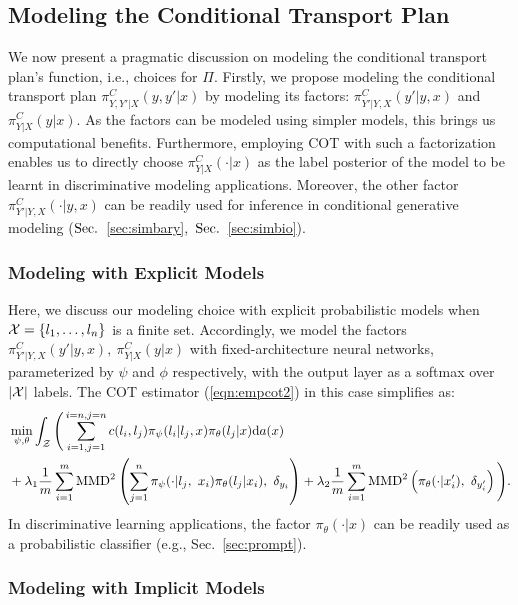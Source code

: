 \subsection{Modeling the Conditional Transport Plan}\label{modeling}
We now present a pragmatic discussion on modeling the conditional transport plan's function, i.e., choices for $\Pi$. Firstly, we propose modeling the conditional transport plan $\pi^C_{Y, Y'|X}(y, y'|x)$ by modeling its factors: $\pi^C_{Y'|Y, X}(y'|y, x)$ and $\pi^C_{Y|X}(y|x)$. As the factors can be modeled using simpler models, this brings us computational benefits. Furthermore, employing COT with such a factorization enables us to directly choose $\pi^C_{Y|X}(\cdot|x)$ as the label posterior of the model to be learnt in discriminative modeling applications. Moreover, the other factor $\pi^C_{Y'|Y, X}(\cdot|y, x)$ can be readily used for inference in conditional generative modeling ({$\S$~\ref{sec:simbary},~$\S$~\ref{sec:simbio}}).

\subsubsection{Modeling with Explicit Models}\label{expl}
Here, we discuss our modeling choice with explicit probabilistic models when $\calX=\left\{l_1,\ldots,l_n\right\}$ is a finite set. Accordingly, we model the factors $\pi^C_{Y'|Y, X}(y'|y, x),~\pi^C_{Y|X}(y|x)$ with fixed-architecture neural networks, parameterized by $\psi$ and $\phi$ respectively, with the output layer as a softmax over $|\calX|$ labels. The COT estimator (\ref{eqn:empcot2}) in this case simplifies as: 
\begin{align}\label{eqn:expexpcot}\nonumber
&\min\limits_{\psi,\theta}\int_{\calZ}\Bigg(\sum_{i=1,j=1}^{i=n,j=n} c(l_i,l_j)\pi_\psi(l_i|l_j,x)\pi_\theta(l_j|x)\textup{d}a(x) \\&+\lambda_1\frac{1}{m}\sum_{i=1}^m\MMD^2\left(\sum_{j=1}^n\pi_\psi(\cdot|l_j,~x_i)\pi_\theta(l_j|x_i), ~\delta_{y_i}\right)+\lambda_2\frac{1}{m}\sum_{i=1}^m\MMD^2\left(\pi_\theta(\cdot|x'_i), ~\delta_{y'_i}\right)\Bigg).
\end{align}
In discriminative learning applications, the factor $\pi_\theta(\cdot|x)$ can be readily used as a probabilistic classifier (e.g., Sec.~\ref{sec:prompt}).

\subsubsection{Modeling with Implicit Models}\label{imp} 


